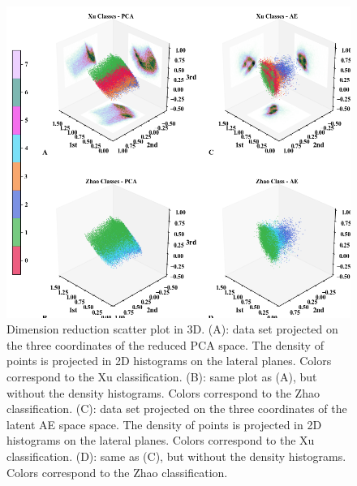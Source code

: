 \documentclass[utf8]{frontiersSCNS} %
\begin{document}
\begin{figure}[h!]
	\begin{center}
		\includegraphics[width=12cm]{Amaya/dimreduc}%
	\end{center}
	\caption{Dimension reduction scatter plot in 3D. (A): data set projected on the three coordinates of the reduced PCA space. The density of points is projected in 2D histograms on the lateral planes. Colors correspond to the Xu classification. (B): same plot as (A), but without the density histograms. Colors correspond to the Zhao classification. (C): data set projected on the three coordinates of the latent AE space space. The density of points is projected in 2D histograms on the lateral planes. Colors correspond to the Xu classification. (D): same as (C), but without the density histograms. Colors correspond to the Zhao classification. }\label{fig:dimreduc}
\end{figure}
\end{document}
